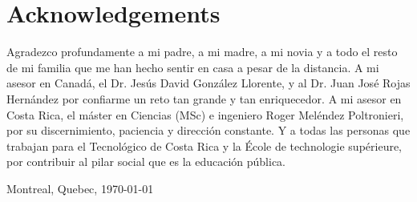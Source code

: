 \chapter*{Acknowledgements}
\thispagestyle{empty}

Agradezco profundamente a mi padre, a mi madre, a mi novia y a todo el resto de mi familia que me han hecho sentir en casa a pesar de la distancia.
A mi asesor en Canadá, el Dr. Jesús David González Llorente, y al Dr. Juan José Rojas Hernández por confiarme un reto tan grande y tan enriquecedor.
A mi asesor en Costa Rica, el máster en Ciencias (MSc) e ingeniero Roger Meléndez Poltronieri, por su discernimiento, paciencia y dirección constante.
Y a todas las personas que trabajan para el Tecnológico de Costa Rica y la École de technologie supérieure, por contribuir al pilar social que es la educación pública.

\vspace*{1cm}

\scriptAuthor

Montreal, Quebec, \today

\cleardoublepage

